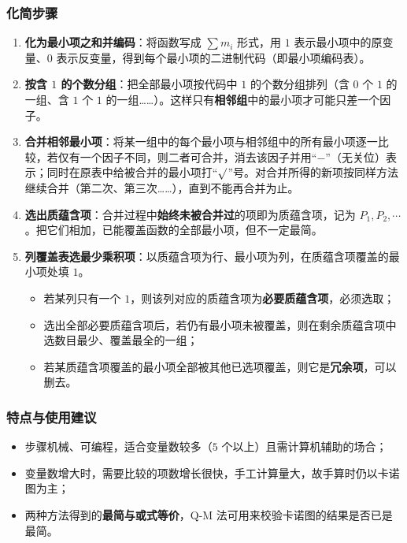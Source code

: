 \subsubsection{化简步骤}
\begin{enumerate}
    \item \textbf{化为最小项之和并编码}：将函数写成 $\sum m_i$ 形式，用 $1$ 表示最小项中的原变量、$0$ 表示反变量，得到每个最小项的二进制代码（即最小项编码表）。
    \item \textbf{按含 $1$ 的个数分组}：把全部最小项按代码中 $1$ 的个数分组排列（含 $0$ 个 $1$ 的一组、含 $1$ 个 $1$ 的一组……）。这样只有\textbf{相邻组}中的最小项才可能只差一个因子。
    \item \textbf{合并相邻最小项}：将某一组中的每个最小项与相邻组中的所有最小项逐一比较，若仅有一个因子不同，则二者可合并，消去该因子并用``$-$''（无关位）表示；同时在原表中给被合并的最小项打``$\surd$''号。对合并所得的新项按同样方法继续合并（第二次、第三次……），直到不能再合并为止。
    \item \textbf{选出质蕴含项}：合并过程中\textbf{始终未被合并过}的项即为质蕴含项，记为 $P_1,P_2,\cdots$。把它们相加，已能覆盖函数的全部最小项，但不一定最简。
    \item \textbf{列覆盖表选最少乘积项}：以质蕴含项为行、最小项为列，在质蕴含项覆盖的最小项处填 $1$。
    \begin{itemize}
        \item 若某列只有一个 $1$，则该列对应的质蕴含项为\textbf{必要质蕴含项}，必须选取；
        \item 选出全部必要质蕴含项后，若仍有最小项未被覆盖，则在剩余质蕴含项中选数目最少、覆盖最全的一组；
        \item 若某质蕴含项覆盖的最小项全部被其他已选项覆盖，则它是\textbf{冗余项}，可以删去。
    \end{itemize}
\end{enumerate}

\subsubsection{特点与使用建议}
\begin{itemize}
    \item 步骤机械、可编程，适合变量数较多（$5$ 个以上）且需计算机辅助的场合；
    \item 变量数增大时，需要比较的项数增长很快，手工计算量大，故手算时仍以卡诺图为主；
    \item 两种方法得到的\textbf{最简与或式等价}，Q-M 法可用来校验卡诺图的结果是否已是最简。
\end{itemize}

